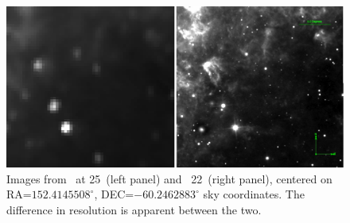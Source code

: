     \begin{figure}
    \centering
    \includegraphics[width=\textwidth]{Ch2/wise_v_iras_152_4145508_m60_2462883}
    \caption[Resolution of \WS\ vs. \iras]{Images from \iras\ at 25\micron\ (left panel) and \WS\ 22\micron\ (right panel), centered on RA=$152.4145508^{\circ}$, DEC=$-60.2462883^{\circ}$ sky coordinates. The difference in resolution is apparent between the two.}
    \label{fig:region_compare}
    \end{figure}
    
    
    
